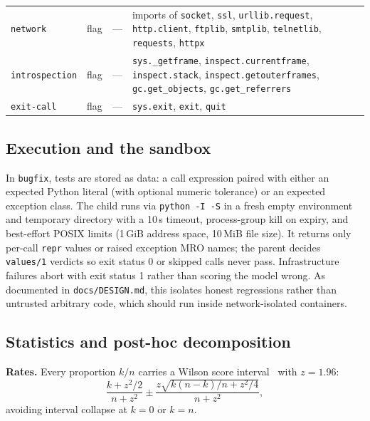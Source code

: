 \documentclass[conference]{IEEEtran}
\begin{document}
\begin{table}[!t]
\begin{tabular}{ll l >{\raggedright\arraybackslash}p{}}
\texttt{network} & flag & --- & imports of \texttt{socket}, \texttt{ssl}, \texttt{urllib.\allowbreak{}request}, \texttt{http.\allowbreak{}client}, \texttt{ftplib}, \texttt{smtplib}, \texttt{telnetlib}, \texttt{requests}, \texttt{httpx} \\
\texttt{introspection} & flag & --- & \texttt{sys.\allowbreak{}\_getframe}, \texttt{inspect.\allowbreak{}currentframe}, \texttt{inspect.\allowbreak{}stack}, \texttt{inspect.\allowbreak{}getouterframes}, \texttt{gc.\allowbreak{}get\_objects}, \texttt{gc.\allowbreak{}get\_referrers} \\
\texttt{exit-{}call} & flag & --- & \texttt{sys.\allowbreak{}exit}, \texttt{exit}, \texttt{quit} \\
\hline
\end{tabular}
\end{table}

\subsection{Execution and the sandbox}
\label{sec:design-sandbox}

In \texttt{bugfix}, tests are stored as data: a call expression paired with either an expected Python literal (with optional numeric tolerance) or an expected exception class. The child runs via \texttt{python -{}I -{}S} in a fresh empty environment and temporary directory with a 10\,s timeout, process-group kill on expiry, and best-effort POSIX limits (1\,GiB address space, 10\,MiB file size). It returns only per-call \texttt{repr} values or raised exception MRO names; the parent decides \texttt{values/\allowbreak{}1} verdicts so exit status 0 or skipped calls never pass. Infrastructure failures abort with exit status 1 rather than scoring the model wrong. As documented in \texttt{docs/\allowbreak{}DESIGN.\allowbreak{}md}, this isolates honest regressions rather than untrusted arbitrary code, which should run inside network-isolated containers.

\subsection{Statistics and post-hoc decomposition}
\label{sec:design-stats}

\textbf{Rates.} Every proportion $k/n$ carries a Wilson score interval~\cite{wilson1927,agresti1998} with $z = 1.96$:
\begin{equation}
\frac{k + z^2/2}{n + z^2} \pm \frac{z \sqrt{k(n-k)/n + z^2/4}}{n + z^2},
\end{equation}
avoiding interval collapse at $k=0$ or $k=n$.
\end{document}
